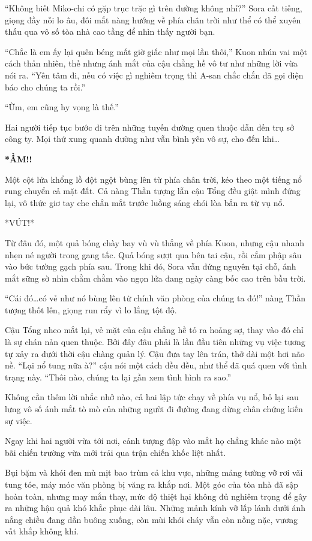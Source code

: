 \documentclass[../main.tex]{subfiles}
\begin{document}
``Không biết Miko-chi có gặp trục trặc gì trên đường không nhỉ?'' Sora cất tiếng, giọng đầy nỗi lo âu, đôi mắt nàng hướng về phía chân trời như thể có thể xuyên thấu qua vô số tòa nhà cao tầng để nhìn thấy người bạn.

``Chắc là em ấy lại quên béng mất giờ giấc như mọi lần thôi,'' Kuon nhún vai một cách thản nhiên, thế nhưng ánh mắt của cậu chẳng hề vô tư như những lời vừa nói ra. ``Yên tâm đi, nếu có việc gì nghiêm trọng thì A-san chắc chắn đã gọi điện báo cho chúng ta rồi.''

``Ừm, em cũng hy vọng là thế.''

Hai người tiếp tục bước đi trên những tuyến đường quen thuộc dẫn đến trụ sở công ty. Mọi thứ xung quanh dường như vẫn bình yên vô sự, cho đến khi\dots

{\large \textbf{*ẦM!!}}

Một cột lửa khổng lồ đột ngột bùng lên từ phía chân trời, kéo theo một tiếng nổ rung chuyển cả mặt đất. Cả nàng Thần tượng lẫn cậu Tổng đều giật mình đứng lại, vô thức giơ tay che chắn mắt trước luồng sáng chói lòa bắn ra từ vụ nổ.

*VÚT!*

Từ đâu đó, một quả bóng chày bay vù vù thẳng về phía Kuon, nhưng cậu nhanh nhẹn né người trong gang tấc. Quả bóng sượt qua bên tai cậu, rồi cắm phập sâu vào bức tường gạch phía sau. Trong khi đó, Sora vẫn đứng nguyên tại chỗ, ánh mắt sững sờ nhìn chằm chằm vào ngọn lửa đang ngày càng bốc cao trên bầu trời.

``Cái đó\dots có vẻ như nó bùng lên từ chính văn phòng của chúng ta đó!'' nàng Thần tượng thốt lên, giọng run rẩy vì lo lắng tột độ.

Cậu Tổng nheo mắt lại, vẻ mặt của cậu chẳng hề tỏ ra hoảng sợ, thay vào đó chỉ là sự chán nản quen thuộc. Bởi đây đâu phải là lần đầu tiên những vụ việc tương tự xảy ra dưới thời cậu chàng quản lý. Cậu đưa tay lên trán, thở dài một hơi não nề. ``Lại nổ tung nữa à?'' cậu nói một cách đều đều, như thể đã quá quen với tình trạng này. ``Thôi nào, chúng ta lại gần xem tình hình ra sao.''

Không cần thêm lời nhắc nhở nào, cả hai lập tức chạy về phía vụ nổ, bỏ lại sau lưng vô số ánh mắt tò mò của những người đi đường đang dừng chân chứng kiến sự việc.

\ct

Ngay khi hai người vừa tới nơi, cảnh tượng đập vào mắt họ chẳng khác nào một bãi chiến trường vừa mới trải qua trận chiến khốc liệt nhất.

Bụi bặm và khói đen mù mịt bao trùm cả khu vực, những mảng tường vỡ rơi vãi tung tóe, máy móc văn phòng bị văng ra khắp nơi. Một góc của tòa nhà đã sập hoàn toàn, nhưng may mắn thay, mức độ thiệt hại không đủ nghiêm trọng để gây ra những hậu quả khó khắc phục dài lâu. Những mảnh kính vỡ lấp lánh dưới ánh nắng chiều đang dần buông xuống, còn mùi khói cháy vẫn còn nồng nặc, vương vất khắp không khí.
\end{document}
